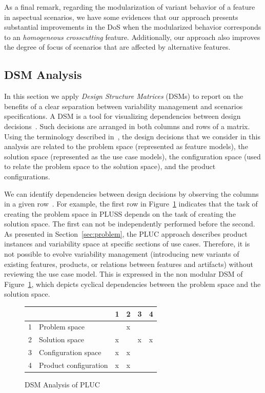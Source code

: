 \documentclass{acm_proc_article-sp}
\begin{document}
As a final remark, regarding the modularization of
variant behavior of a feature in aspectual scenarios, we have some evidences
that our approach presents substantial improvements in the DoS when the
modularized behavior corresponds to an \emph{homogeneous crosscutting} feature. Additionally, our approach also improves the degree of focus of scenarios that are affected by alternative features.

\subsection{DSM Analysis}

In this section we apply \emph{Design Structure Matrices} (DSMs) to report on the benefits of a clear separation between variability management and scenarios specifications. A DSM is a tool for visualizing dependencies between design decisions~\cite{Baldwin:2000aa}. Such decisions are arranged in both columns and rows of a matrix.
Using the terminology described in~\cite{Czarnecki:2000aa}, the design decisions that we consider in this analysis are related to the problem space (represented as feature models), the solution space (represented as the use case models), the configuration space (used to relate the problem space to the solution space), and the product configurations.

 We can identify dependencies between design decisions by observing the columns in a given row~\cite{Baldwin:2000aa}. For example, the first row in Figure~\ref{dsm:pluc} indicates that the task of creating the problem space in PLUSS depends on the task of creating the solution space. The first can not be independently performed before the second. As presented in Section~\ref{sec:problem}, the PLUC approach describes product instances and variability space at specific sections of use cases. Therefore, it is not possible to evolve variability management (introducing new variants of existing features, products, or relations between features and artifacts) without reviewing the use case model. This is expressed in the non modular DSM of Figure~\ref{dsm:pluc}, which depicts cyclical dependencies between the problem space and the solution space.

\begin{figure}[htb]
\centering
\begin{small}
\begin{tabular}{llllll} \hline
  &                         & 1 & 2 & 3 & 4 \\ \hline
1 & Problem space           &   & x &   &   \\
2 & Solution space          & x &   & x & x \\
3 & Configuration space     & x & x &   &   \\
4 & Product configuration   & x & x &   &   \\ \hline
\end{tabular}
\end{small}
\caption{DSM Analysis of PLUC}
\label{dsm:pluc}
\end{figure}
\end{document}
